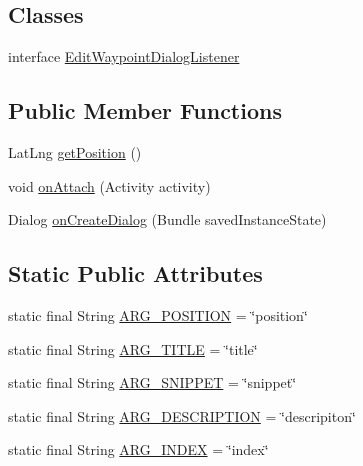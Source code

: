 \subsection*{Classes}
\begin{DoxyCompactItemize}
\item 
interface \hyperlink{interfaceuk_1_1ac_1_1swan_1_1digitaltrails_1_1fragments_1_1_edit_waypoint_dialog_fragment_1_1_edit_waypoint_dialog_listener}{Edit\+Waypoint\+Dialog\+Listener}
\end{DoxyCompactItemize}
\subsection*{Public Member Functions}
\begin{DoxyCompactItemize}
\item 
Lat\+Lng \hyperlink{classuk_1_1ac_1_1swan_1_1digitaltrails_1_1fragments_1_1_edit_waypoint_dialog_fragment_a8aad680d20ef7672832cf6f3e8a33c17}{get\+Position} ()
\item 
void \hyperlink{classuk_1_1ac_1_1swan_1_1digitaltrails_1_1fragments_1_1_edit_waypoint_dialog_fragment_a99a6715b62dbfc7b90f968b3d20192b8}{on\+Attach} (Activity activity)
\item 
Dialog \hyperlink{classuk_1_1ac_1_1swan_1_1digitaltrails_1_1fragments_1_1_edit_waypoint_dialog_fragment_a315436a410c9a7655ecfb756096f0a2b}{on\+Create\+Dialog} (Bundle saved\+Instance\+State)
\end{DoxyCompactItemize}
\subsection*{Static Public Attributes}
\begin{DoxyCompactItemize}
\item 
static final String \hyperlink{classuk_1_1ac_1_1swan_1_1digitaltrails_1_1fragments_1_1_edit_waypoint_dialog_fragment_af004a9b56cf7513f4ecb79c963ebc353}{A\+R\+G\+\_\+\+P\+O\+S\+I\+T\+I\+O\+N} = \char`\"{}position\char`\"{}
\item 
static final String \hyperlink{classuk_1_1ac_1_1swan_1_1digitaltrails_1_1fragments_1_1_edit_waypoint_dialog_fragment_aad3e47036a77df27ad107a61bffcad9b}{A\+R\+G\+\_\+\+T\+I\+T\+L\+E} = \char`\"{}title\char`\"{}
\item 
static final String \hyperlink{classuk_1_1ac_1_1swan_1_1digitaltrails_1_1fragments_1_1_edit_waypoint_dialog_fragment_ae7ecba4d3ab78b83586ed83720458d80}{A\+R\+G\+\_\+\+S\+N\+I\+P\+P\+E\+T} = \char`\"{}snippet\char`\"{}
\item 
static final String \hyperlink{classuk_1_1ac_1_1swan_1_1digitaltrails_1_1fragments_1_1_edit_waypoint_dialog_fragment_ad587605871836c32d04d09b650dddfe1}{A\+R\+G\+\_\+\+D\+E\+S\+C\+R\+I\+P\+T\+I\+O\+N} = \char`\"{}descripiton\char`\"{}
\item 
static final String \hyperlink{classuk_1_1ac_1_1swan_1_1digitaltrails_1_1fragments_1_1_edit_waypoint_dialog_fragment_ab7288eeb66159edbdbd02f67d4eca154}{A\+R\+G\+\_\+\+I\+N\+D\+E\+X} = \char`\"{}index\char`\"{}
\end{DoxyCompactItemize}
